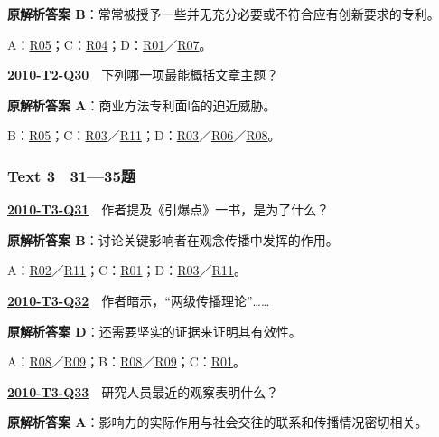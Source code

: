 \documentclass[11pt,a4paper]{article}
\begin{document}
\noindent\textbf{原解析答案 B}：常常被授予一些并无充分必要或不符合应有创新要求的专利。\par\nopagebreak
\noindent A：\hyperref[cat-R05]{R05}；C：\hyperref[cat-R04]{R04}；D：\hyperref[cat-R01]{R01}／\hyperref[cat-R07]{R07}。\par\smallskip
{}\label{idx-2010-T2-Q30}\noindent\textbf{\href{https://zj139.github.io/math-notes/english/68417426c052b03f4b409683/\#q30}{2010-T2-Q30}}　下列哪一项最能概括文章主题？\par\nopagebreak
\noindent\textbf{原解析答案 A}：商业方法专利面临的迫近威胁。\par\nopagebreak
\noindent B：\hyperref[cat-R05]{R05}；C：\hyperref[cat-R03]{R03}／\hyperref[cat-R11]{R11}；D：\hyperref[cat-R03]{R03}／\hyperref[cat-R06]{R06}／\hyperref[cat-R08]{R08}。\par\smallskip
\clearpage
{}\subsubsection{Text 3　31—35题}
\label{idx-2010-T3-Q31}\noindent\textbf{\href{https://zj139.github.io/math-notes/english/2d3d87506df0a87664eef64d/\#q31}{2010-T3-Q31}}　作者提及《引爆点》一书，是为了什么？\par\nopagebreak
\noindent\textbf{原解析答案 B}：讨论关键影响者在观念传播中发挥的作用。\par\nopagebreak
\noindent A：\hyperref[cat-R02]{R02}／\hyperref[cat-R11]{R11}；C：\hyperref[cat-R01]{R01}；D：\hyperref[cat-R03]{R03}／\hyperref[cat-R11]{R11}。\par\smallskip
{}\label{idx-2010-T3-Q32}\noindent\textbf{\href{https://zj139.github.io/math-notes/english/2d3d87506df0a87664eef64d/\#q32}{2010-T3-Q32}}　作者暗示，“两级传播理论”……\par\nopagebreak
\noindent\textbf{原解析答案 D}：还需要坚实的证据来证明其有效性。\par\nopagebreak
\noindent A：\hyperref[cat-R08]{R08}／\hyperref[cat-R09]{R09}；B：\hyperref[cat-R08]{R08}／\hyperref[cat-R09]{R09}；C：\hyperref[cat-R01]{R01}。\par\smallskip
{}\label{idx-2010-T3-Q33}\noindent\textbf{\href{https://zj139.github.io/math-notes/english/2d3d87506df0a87664eef64d/\#q33}{2010-T3-Q33}}　研究人员最近的观察表明什么？\par\nopagebreak
\noindent\textbf{原解析答案 A}：影响力的实际作用与社会交往的联系和传播情况密切相关。\par\nopagebreak
\end{document}
